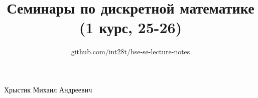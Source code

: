 \documentclass[a4paper,12pt]{article}
\title{Семинары по дискретной математике (1 курс, 25-26)}
\author{github.com/int28t/hse-se-lecture-notes}
\date{}
\begin{document}
    \pagestyle{empty}
	\maketitle
    \begin{flushright}
		Хрыстик Михаил Андреевич
	\end{flushright}
	\tableofcontents{}
    \newpage
    \pagestyle{plain}
    
    \newpage
    
    \newpage
    
    \newpage
    
\end{document}
